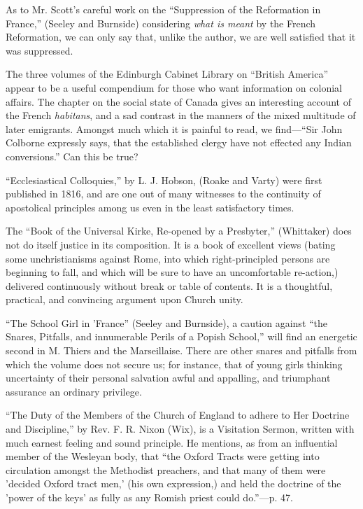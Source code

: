 As to Mr. Scott's careful work on the ``Suppression
of the Reformation in France,'' (Seeley and Burnside) considering \emph{what
is meant} by the French Reformation, we can only say that, unlike the
author, we are well satisfied that it was suppressed.

The three volumes of the Edinburgh Cabinet Library
on ``British America'' appear to be a useful compendium for those who want
information on colonial affairs. The chapter on the social state of
Canada gives an interesting account of the French \emph{habitans}, and a
sad contrast in the manners of the mixed multitude of later emigrants.
Amongst much which it is painful to read, we find—``Sir John Colborne
expressly says, that the established clergy have not effected any Indian
conversions.'' Can this be true?

``Ecclesiastical Colloquies,'' by L. J. Hobson, (Roake
and Varty) were first published in 1816, and are one out of many
witnesses to the continuity of apostolical principles among us even in
the least satisfactory times.

The ``Book of the Universal Kirke, Re-opened by a
Presbyter,'' (Whittaker) does not do itself justice in its composition.
It is a book of excellent views (bating some unchristianisms against
Rome, into which right-principled persons are beginning to fall, and
which will be sure to have an uncomfortable re-action,) delivered
continuously without break or table of contents. It is a thoughtful,
practical, and convincing argument upon Church unity.

``The School Girl in 'France'' (Seeley and Burnside),
a caution against ``the Snares, Pitfalls, and innumerable Perils of a
Popish School,'' will find an energetic second in M. Thiers and the
Marseillaise. There are other snares and pitfalls from which the volume
does not secure us; for instance, that of young girls thinking
uncertainty of their personal salvation awful and appalling, and
triumphant assurance an ordinary privilege.

``The Duty of the Members of the Church of England
to adhere to Her Doctrine and Discipline,'' by Rev. F. R. Nixon (Wix), is
a Visitation Sermon, written with much earnest feeling and sound
principle. He mentions, as from an influential member of the Wesleyan
body, that ``the Oxford Tracts were getting into circulation amongst the
Methodist preachers, and that many of them were 'decided Oxford tract
men,' (his own expression,) and held the doctrine of the 'power of the
keys' as fully as any Romish priest could do.''—p. 47.

